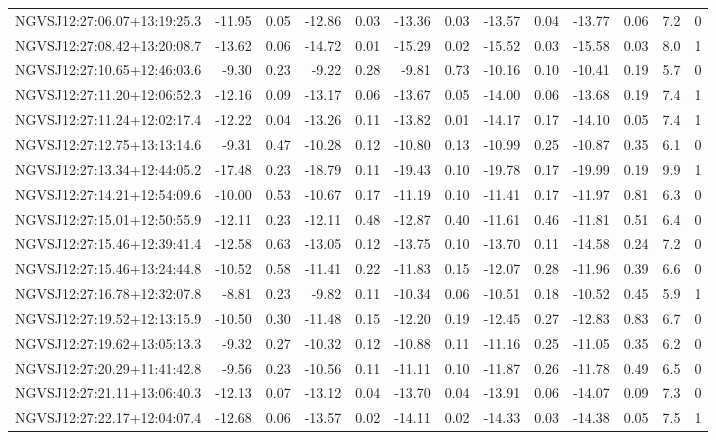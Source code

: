 \begin{tabular}{lrrrrrrrrrrcc}
NGVSJ12:27:06.07+13:19:25.3 & -11.95 & 0.05 & -12.86 & 0.03 & -13.36 & 0.03 & -13.57 & 0.04 & -13.77 & 0.06 & 7.2 & 0 \\
NGVSJ12:27:08.42+13:20:08.7 & -13.62 & 0.06 & -14.72 & 0.01 & -15.29 & 0.02 & -15.52 & 0.03 & -15.58 & 0.03 & 8.0 & 1 \\
NGVSJ12:27:10.65+12:46:03.6 & -9.30 & 0.23 & -9.22 & 0.28 & -9.81 & 0.73 & -10.16 & 0.10 & -10.41 & 0.19 & 5.7 & 0 \\
NGVSJ12:27:11.20+12:06:52.3 & -12.16 & 0.09 & -13.17 & 0.06 & -13.67 & 0.05 & -14.00 & 0.06 & -13.68 & 0.19 & 7.4 & 1 \\
NGVSJ12:27:11.24+12:02:17.4 & -12.22 & 0.04 & -13.26 & 0.11 & -13.82 & 0.01 & -14.17 & 0.17 & -14.10 & 0.05 & 7.4 & 1 \\
NGVSJ12:27:12.75+13:13:14.6 & -9.31 & 0.47 & -10.28 & 0.12 & -10.80 & 0.13 & -10.99 & 0.25 & -10.87 & 0.35 & 6.1 & 0 \\
NGVSJ12:27:13.34+12:44:05.2 & -17.48 & 0.23 & -18.79 & 0.11 & -19.43 & 0.10 & -19.78 & 0.17 & -19.99 & 0.19 & 9.9 & 1 \\
NGVSJ12:27:14.21+12:54:09.6 & -10.00 & 0.53 & -10.67 & 0.17 & -11.19 & 0.10 & -11.41 & 0.17 & -11.97 & 0.81 & 6.3 & 0 \\
NGVSJ12:27:15.01+12:50:55.9 & -12.11 & 0.23 & -12.11 & 0.48 & -12.87 & 0.40 & -11.61 & 0.46 & -11.81 & 0.51 & 6.4 & 0 \\
NGVSJ12:27:15.46+12:39:41.4 & -12.58 & 0.63 & -13.05 & 0.12 & -13.75 & 0.10 & -13.70 & 0.11 & -14.58 & 0.24 & 7.2 & 0 \\
NGVSJ12:27:15.46+13:24:44.8 & -10.52 & 0.58 & -11.41 & 0.22 & -11.83 & 0.15 & -12.07 & 0.28 & -11.96 & 0.39 & 6.6 & 0 \\
NGVSJ12:27:16.78+12:32:07.8 & -8.81 & 0.23 & -9.82 & 0.11 & -10.34 & 0.06 & -10.51 & 0.18 & -10.52 & 0.45 & 5.9 & 1 \\
NGVSJ12:27:19.52+12:13:15.9 & -10.50 & 0.30 & -11.48 & 0.15 & -12.20 & 0.19 & -12.45 & 0.27 & -12.83 & 0.83 & 6.7 & 0 \\
NGVSJ12:27:19.62+13:05:13.3 & -9.32 & 0.27 & -10.32 & 0.12 & -10.88 & 0.11 & -11.16 & 0.25 & -11.05 & 0.35 & 6.2 & 0 \\
NGVSJ12:27:20.29+11:41:42.8 & -9.56 & 0.23 & -10.56 & 0.11 & -11.11 & 0.10 & -11.87 & 0.26 & -11.78 & 0.49 & 6.5 & 0 \\
NGVSJ12:27:21.11+13:06:40.3 & -12.13 & 0.07 & -13.12 & 0.04 & -13.70 & 0.04 & -13.91 & 0.06 & -14.07 & 0.09 & 7.3 & 0 \\
NGVSJ12:27:22.17+12:04:07.4 & -12.68 & 0.06 & -13.57 & 0.02 & -14.11 & 0.02 & -14.33 & 0.03 & -14.38 & 0.05 & 7.5 & 1 \\

\end{tabular}
